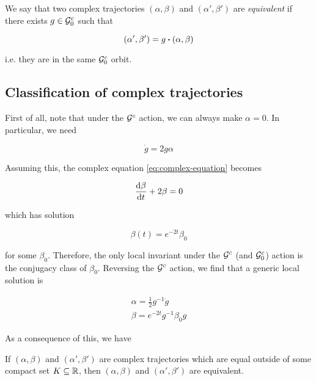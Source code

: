 \documentclass{report}
\begin{document}
\begin{definition}
     We say that two complex trajectories \((\alpha, \beta)\) and \((\alpha', \beta')\) are \emph{equivalent} if there exists \(g \in \mathcal{G}^c_0\) such that

    \[(\alpha', \beta') = g \vdot (\alpha, \beta)\]

    i.e. they are in the same \(\mathcal{G}_0^c\) orbit.
\end{definition}

\subsection{Classification of complex trajectories}

First of all, note that under the \(\mathcal{G}^c\) action, we can always make \(\alpha = 0\). In particular, we need

\[\dot g = 2g\alpha\]

Assuming this, the complex equation \cref{eq:complex-equation} becomes

\[\dv{\beta}{t} + 2\beta = 0\]

which has solution

\[\beta(t) = e^{-2t}\beta_0\]

for some \(\beta_0\). Therefore, the only local invariant under the \(\mathcal{G}^c\) (and \(\mathcal{G}^c_0\)) action is the conjugacy class of \(\beta_0\). Reversing the \(\mathcal{G}^c\) action, we find that a generic local solution is

\begin{align*}
    \alpha = \frac{1}{2}g^{-1}\dot g \\
    \beta = e^{-2t}g^{-1}\beta_0g
\end{align*}

As a consequence of this, we have

\begin{lemma}
    \label{lem:complex-trajectory-equal}

    If \((\alpha, \beta)\) and \((\alpha', \beta')\) are complex trajectories which are equal outside of some compact set \(K \subseteq \mathbb{R}\), then \((\alpha, \beta)\) and \((\alpha', \beta')\) are equivalent.
\end{lemma}
\end{document}
